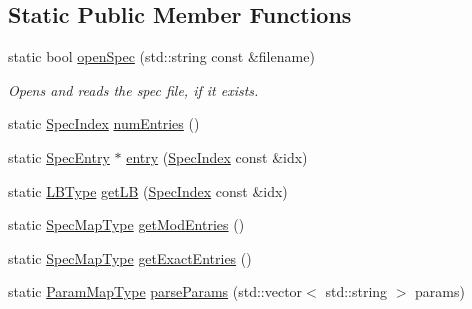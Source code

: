 \subsection*{Static Public Member Functions}
\begin{DoxyCompactItemize}
\item 
static bool \hyperlink{structvt_1_1vrt_1_1collection_1_1balance_1_1_read_l_b_spec_a7da8702619a292b50188ff15c6e88c71}{open\+Spec} (std\+::string const \&filename)
\begin{DoxyCompactList}\small\item\em Opens and reads the spec file, if it exists. \end{DoxyCompactList}\item 
static \hyperlink{namespacevt_1_1vrt_1_1collection_1_1balance_a72a5e0d9936ddf57f8e6c64e0e9fd123}{Spec\+Index} \hyperlink{structvt_1_1vrt_1_1collection_1_1balance_1_1_read_l_b_spec_ab7a988ed27206ee728474ad200c47291}{num\+Entries} ()
\item 
static \hyperlink{structvt_1_1vrt_1_1collection_1_1balance_1_1_spec_entry}{Spec\+Entry} $\ast$ \hyperlink{structvt_1_1vrt_1_1collection_1_1balance_1_1_read_l_b_spec_af9e1e7f7ea03e6a7bc06d38c2ca28544}{entry} (\hyperlink{namespacevt_1_1vrt_1_1collection_1_1balance_a72a5e0d9936ddf57f8e6c64e0e9fd123}{Spec\+Index} const \&idx)
\item 
static \hyperlink{namespacevt_1_1vrt_1_1collection_1_1balance_ac4f99693509affcc67db182d4aad9b5c}{L\+B\+Type} \hyperlink{structvt_1_1vrt_1_1collection_1_1balance_1_1_read_l_b_spec_a55d8e971ad0821c272aeb3c20455c389}{get\+LB} (\hyperlink{namespacevt_1_1vrt_1_1collection_1_1balance_a72a5e0d9936ddf57f8e6c64e0e9fd123}{Spec\+Index} const \&idx)
\item 
static \hyperlink{structvt_1_1vrt_1_1collection_1_1balance_1_1_read_l_b_spec_aa73c3611c615832402eeeed6fb7b8049}{Spec\+Map\+Type} \hyperlink{structvt_1_1vrt_1_1collection_1_1balance_1_1_read_l_b_spec_a8fbbc8343a79844abdfd16536ff4ea2b}{get\+Mod\+Entries} ()
\item 
static \hyperlink{structvt_1_1vrt_1_1collection_1_1balance_1_1_read_l_b_spec_aa73c3611c615832402eeeed6fb7b8049}{Spec\+Map\+Type} \hyperlink{structvt_1_1vrt_1_1collection_1_1balance_1_1_read_l_b_spec_a9a982a88b574472a21a3e574cc6c27ba}{get\+Exact\+Entries} ()
\item 
static \hyperlink{structvt_1_1vrt_1_1collection_1_1balance_1_1_read_l_b_spec_a05e30b32f0ca5df2cb160514fa0eeb41}{Param\+Map\+Type} \hyperlink{structvt_1_1vrt_1_1collection_1_1balance_1_1_read_l_b_spec_a69993cae4576e25d70929e95dad81d7e}{parse\+Params} (std\+::vector$<$ std\+::string $>$ params)

\end{DoxyCompactItemize}
